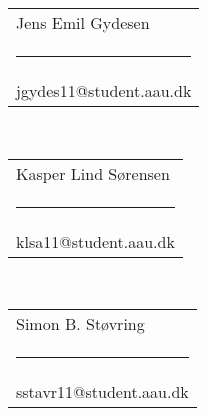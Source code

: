 \newcommand{\signature}[3][5cm]{%
  \begin{tabular}{@{}p{#1}@{}}
    #2 \\[2\normalbaselineskip] \hrule \\[0pt]
    {\small #3} \\[2\normalbaselineskip]
  \end{tabular}
}

\centering
\signature{Jens Emil Gydesen}{jgydes11@student.aau.dk}
\\ \vspace{1cm}
\signature{Kasper Lind Sørensen}{klsa11@student.aau.dk}
\\ \vspace{1cm}
\signature{Simon B. Støvring}{sstavr11@student.aau.dk}

